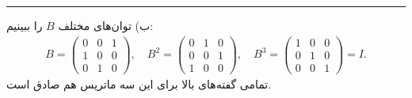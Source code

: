 \documentclass[a4paper, 12pt]{article}
\begin{document}
\par\noindent\rule{\textwidth}{0.6pt}
ب) توان‌های مختلف $B$ را ببینیم:
\begin{equation*}
	\begin{aligned}
		B=
		\begin{pmatrix}
			0 &  0 & 1 \\ 1 & 0 & 0 \\ 0 & 1 & 0
		\end{pmatrix}, \quad B^2=
		\begin{pmatrix}
		0 &  1 & 0 \\ 0 & 0 & 1 \\ 1 & 0 & 0
		\end{pmatrix}, \quad B^3=
		\begin{pmatrix}
			1 &  0 & 0 \\ 0 & 1 & 0 \\ 0 & 0 & 1
		\end{pmatrix} = I.
	\end{aligned}
\end{equation*}
تمامی گفته‌های بالا برای این سه ماتریس هم صادق است.
\end{document}
